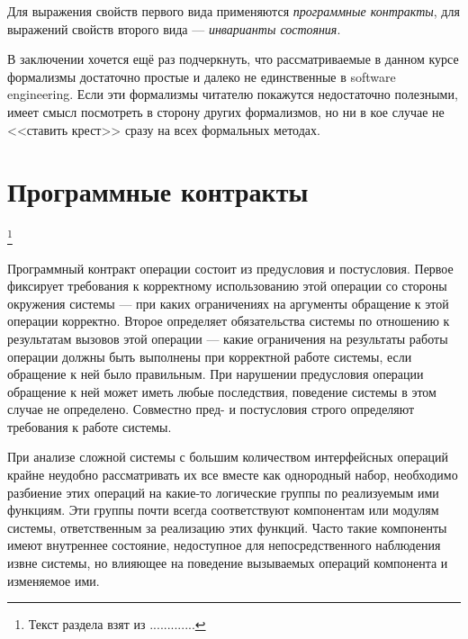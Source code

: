 \documentclass[14pt, twoside]{extreport}
\begin{document}
Для выражения свойств первого вида применяются \emph{программные контракты}, для выражений свойств второго вида --- \emph{инварианты состояния}.

В заключении хочется ещё раз подчеркнуть, что рассматриваемые в данном курсе формализмы достаточно простые и далеко не единственные в software engineering. Если эти формализмы читателю покажутся недостаточно полезными, имеет смысл посмотреть в сторону других формализмов, но ни в кое случае не <<ставить крест>> сразу на всех формальных методах.


\section{Программные контракты}\footnote{Текст раздела взят из .............}

Программный контракт операции состоит из предусловия и постусловия. Первое фиксирует требования к корректному использованию этой операции со стороны окружения системы — при каких ограничениях на аргументы обращение к этой операции корректно. Второе определяет обязательства системы по отношению к результатам вызовов этой операции — какие ограничения на результаты работы операции должны быть выполнены при корректной работе системы, если обращение к ней было правильным. При нарушении предусловия операции обращение к ней может иметь любые последствия, поведение системы в этом случае не определено. Совместно пред- и постусловия строго определяют требования к работе системы.

При анализе сложной системы с большим количеством интерфейсных операций крайне неудобно рассматривать их все вместе как однородный набор, необходимо разбиение этих операций на какие-то логические группы по реализуемым ими функциям. Эти группы почти всегда соответствуют компонентам или модулям системы, ответственным за реализацию этих функций. Часто такие компоненты имеют внутреннее состояние, недоступное для непосредственного наблюдения извне системы, но влияющее на поведение вызываемых операций компонента и изменяемое ими.
\end{document}
